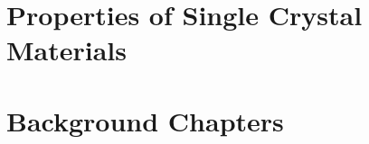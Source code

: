 \documentclass[11pt,fleqn,A4paper]{book} %
\begin{document}




\part{Properties of Single Crystal Materials}

\part{Background Chapters}



\end{document}
